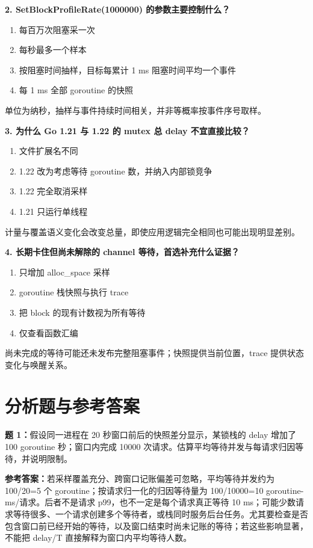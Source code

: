 \documentclass[UTF8,fontset=fandol,openany,11pt]{ctexbook}
\begin{document}
\noindent\textbf{2. SetBlockProfileRate(1000000) 的参数主要控制什么？}
\begin{enumerate}[label=\Alph*.]
\item 每百万次阻塞采一次
\item 每秒最多一个样本
\item 按阻塞时间抽样，目标每累计 1 ms 阻塞时间平均一个事件
\item 每 1 ms 全部 goroutine 的快照
\end{enumerate}
单位为纳秒，抽样与事件持续时间相关，并非等概率按事件序号取样。

\noindent\textbf{3. 为什么 Go 1.21 与 1.22 的 mutex 总 delay 不宜直接比较？}
\begin{enumerate}[label=\Alph*.]
\item 文件扩展名不同
\item 1.22 改为考虑等待 goroutine 数，并纳入内部锁竞争
\item 1.22 完全取消采样
\item 1.21 只运行单线程
\end{enumerate}
计量与覆盖语义变化会改变总量，即使应用逻辑完全相同也可能出现明显差别。

\noindent\textbf{4. 长期卡住但尚未解除的 channel 等待，首选补充什么证据？}
\begin{enumerate}[label=\Alph*.]
\item 只增加 alloc\_space 采样
\item goroutine 栈快照与执行 trace
\item 把 block 的现有计数视为所有等待
\item 仅查看函数汇编
\end{enumerate}
尚未完成的等待可能还未发布完整阻塞事件；快照提供当前位置，trace 提供状态变化与唤醒关系。

\section{分析题与参考答案}
\noindent\textbf{题 1：}假设同一进程在 20 秒窗口前后的快照差分显示，某锁栈的 delay 增加了 100 goroutine 秒；窗口内完成 10000 次请求。估算平均等待并发与每请求归因等待，并说明限制。

\noindent\textbf{参考答案：}若采样覆盖充分、跨窗口记账偏差可忽略，平均等待并发约为 100/20=5 个 goroutine；按请求归一化的归因等待量为 100/10000=10 goroutine-ms/请求。后者不是请求 p99，也不一定是每个请求真正等待 10 ms；可能少数请求等待很多、一个请求创建多个等待者，或栈同时服务后台任务。尤其要检查是否包含窗口前已经开始的等待，以及窗口结束时尚未记账的等待；若这些影响显著，不能把 delay/T 直接解释为窗口内平均等待人数。
\end{document}
